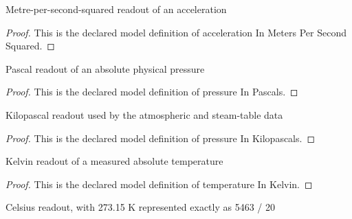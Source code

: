 \begin{definition}
  \label{def:physics:phyx-mini-0440:phyxminiproblems-problemphyxmini0440-accelerationinmeterspersecondsquared}
  Metre-per-second-squared readout of an acceleration
\end{definition}
\begin{proof}
  This is the declared model definition of acceleration In Meters Per Second Squared.
\end{proof}
\begin{definition}
  \label{def:physics:phyx-mini-0440:phyxminiproblems-problemphyxmini0440-pressureinpascals}
  Pascal readout of an absolute physical pressure
\end{definition}
\begin{proof}
  This is the declared model definition of pressure In Pascals.
\end{proof}
\begin{definition}
  \label{def:physics:phyx-mini-0440:phyxminiproblems-problemphyxmini0440-pressureinkilopascals}
  Kilopascal readout used by the atmospheric and steam-table data
\end{definition}
\begin{proof}
  This is the declared model definition of pressure In Kilopascals.
\end{proof}
\begin{definition}
  \label{def:physics:phyx-mini-0440:phyxminiproblems-problemphyxmini0440-temperatureinkelvin}
  Kelvin readout of a measured absolute temperature
\end{definition}
\begin{proof}
  This is the declared model definition of temperature In Kelvin.
\end{proof}
\begin{definition}
  \label{def:physics:phyx-mini-0440:phyxminiproblems-problemphyxmini0440-temperatureindegreescelsius}
  Celsius readout, with 273.15 K represented exactly as 5463 / 20
\end{definition}
